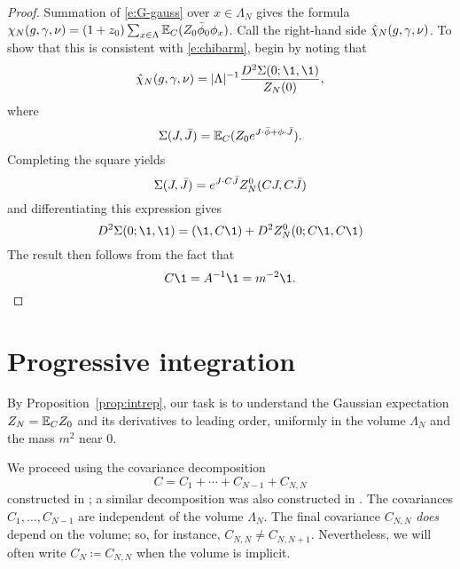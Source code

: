 \begin{proof}
Summation of \eqref{e:G-gauss} over $x\in \Lambda_N$ gives the formula
$\chi_N(g,\gamma,\nu) = (1+z_0)\sum_{x\in \Lambda} \mathbb{E}_C (Z_0\bar\phi_0\phi_x)$.
Call the right-hand side $\hat\chi_N(g,\gamma,\nu)$. To show that this is
consistent with \eqref{e:chibarm}, begin by noting that
\begin{equation}
\hat\chi_N(\gcc,\gamma,\nu)
	=
|\Lambda|^{-1} \frac{D^2 \Sigma(0; \1, \1)}{Z_N(0)},
\end{equation}
where
\begin{equation}
\Sigma(J, \bar J) = \mathbb{E}_C (Z_0 e^{J \cdot \bar\phi + \phi \cdot \bar J}).
\end{equation}
Completing the square yields
\begin{equation}
\Sigma(J, \bar J)
	=
e^{J \cdot C \bar J} Z_N^0(C J, C \bar J)
\end{equation}
and differentiating this expression gives
\begin{equation}
D^2 \Sigma(0; \1, \1)
	=
(\1, C \1) + D^2 Z_N^\zero(0; C\1, C\1)
\end{equation}
The result then follows from the fact that
\begin{equation}
C \1 = A^{-1} \1 = m^{-2} \1.
\end{equation}
\end{proof}


\section{Progressive integration}
\label{sec:prog}

By Proposition~\ref{prop:intrep}, our task is to understand the Gaussian expectation
$Z_N = \mathbb{E}_C Z_0$ and its derivatives to leading order, uniformly in the volume
$\Lambda_N$ and the mass $m^2$ near $0$.

We proceed using the covariance decomposition
\begin{equation}
\label{e:NCj}
C = C_1 + \cdots + C_{N-1} + C_{N,N}
\end{equation}
constructed in \cite{Baue13a}; a similar decomposition was also constructed in \cite{BGM04}.
The covariances $C_1, \ldots, C_{N-1}$ are independent of the volume $\Lambda_N$. The final
covariance $C_{N,N}$ \emph{does} depend on the volume; so, for instance, $C_{N,N} \ne C_{N,N+1}$.
Nevertheless, we will often write $C_N \coloneqq C_{N,N}$ when the volume is implicit.


